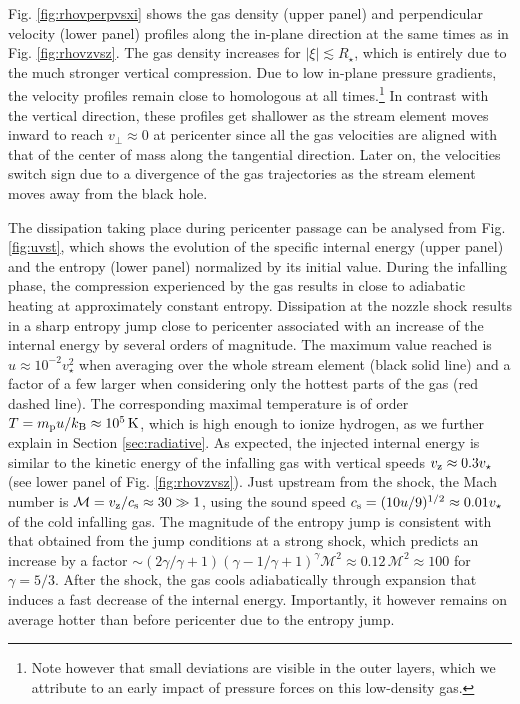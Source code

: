 \documentclass[a4paper,fleqn,usenatbib]{mnras}
\newcommand{\rstar}{R_{\star}}
\def\kelvin{\, \rm K}
\begin{document}
Fig. \ref{fig:rhovperpvsxi} shows the gas density (upper panel) and perpendicular velocity (lower panel) profiles along the in-plane direction at the same times as in Fig. \ref{fig:rhovzvsz}. The gas density increases for $|\xi| \lesssim \rstar$, which is entirely due to the much stronger vertical compression. Due to low in-plane pressure gradients, the velocity profiles remain close to homologous at all times.\footnote{Note however that small deviations are visible in the outer layers, which we attribute to an early impact of pressure forces on this low-density gas.} In contrast with the vertical direction, these profiles get shallower as the stream element moves inward to reach $v_{\perp} \approx 0$ at pericenter since all the gas velocities are aligned with that of the center of mass along the tangential direction. Later on, the velocities switch sign due to a divergence of the gas trajectories as the stream element moves away from the black hole.



The dissipation taking place during pericenter passage can be analysed from Fig. \ref{fig:uvst}, which shows the evolution of the specific internal energy (upper panel) and the entropy (lower panel) normalized by its initial value. During the infalling phase, the compression experienced by the gas results in close to adiabatic heating at approximately constant entropy. Dissipation at the nozzle shock results in a sharp entropy jump close to pericenter associated with an increase of the internal energy by several orders of magnitude. The maximum value reached is $u \approx 10^{-2} v^2_{\star}$ when averaging over the whole stream element (black solid line) and a factor of a few larger when considering only the hottest parts of the gas (red dashed line). The corresponding maximal temperature is of order $T = m_{\rm p} u / k_{\rm B} \approx 10^5 \kelvin$, which is high enough to ionize hydrogen, as we further explain in Section \ref{sec:radiative}. As expected, the injected internal energy is similar to the kinetic energy of the infalling gas with vertical speeds $v_{\rm z} \approx 0.3 v_{\star}$ (see lower panel of Fig. \ref{fig:rhovzvsz}). Just upstream from the shock, the Mach number is $\mathcal{M} = v_{\rm z}/c_{\rm s} \approx 30 \gg 1$, using the sound speed $c_{\rm s} = (10 u/9)^{1/2} \approx 0.01 v_{\star}$ of the cold infalling gas. The magnitude of the entropy jump is consistent with that obtained from the jump conditions at a strong shock, which predicts an increase by a factor $\sim (2\gamma / \gamma +1)(\gamma-1/\gamma+1)^{\gamma} \mathcal{M}^2 \approx 0.12 \, \mathcal{M}^2 \approx 100$ \citetext{equation (1.85) of \citealt{zeldovich1967}} for $\gamma = 5/3$. After the shock, the gas cools adiabatically through expansion that induces a fast decrease of the internal energy. Importantly, it however remains on average hotter than before pericenter due to the entropy jump.
\end{document}

